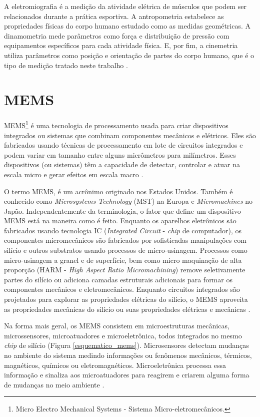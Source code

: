 A eletromiografia é a medição da atividade elétrica de músculos que podem ser relacionados durante a prática esportiva. A antropometria estabelece as propriedades físicas do corpo humano estudado como as medidas geométricas. A dinamometria mede parâmetros como força e distribuição de pressão com equipamentos específicos para cada atividade física. E, por fim, a cinemetria utiliza parâmetros como posição e orientação de partes do corpo humano, que é o tipo de medição tratado neste trabalho \cite{amadio2007}\cite{medeiros2013}.
	
	\section{MEMS}

		MEMS\footnote{Micro Electro Mechanical Systems - Sistema Micro-eletromecânicos.}  é uma tecnologia de processamento usada para criar dispositivos integrados ou sistemas que combinam componentes mecânicos e elétricos. Eles são fabricados usando técnicas de processamento em lote de circuitos integrados e podem variar em tamanho entre alguns micrômetros para milímetros. Esses dispositivos (ou sistemas) têm a capacidade de detectar, controlar e atuar na escala micro e gerar efeitos em escala macro \cite{prime2002}. 

		O termo MEMS, é um acrônimo originado nos Estados Unidos. Também é conhecido como \textit{Microsystems Technology} (MST) na Europa e \textit{Micromachines} no Japão. Independentemente da terminologia, o fator que define um dispositivo MEMS está na maneira como é feito. Enquanto os aparelhos eletrônicos são fabricados usando tecnologia IC (\textit{Integrated Circuit} - \textit{chip} de computador), os componentes micromecânicos são fabricados por sofisticadas manipulações com silício e outros substratos usando processos de micro-usinagem. Processos como micro-usinagem a granel e de superfície, bem como micro maquinação de alta proporção (HARM - \textit{High Aspect Ratio Micromachining}) remove seletivamente partes do silício ou adiciona camadas estruturais adicionais para formar os componentes mecânicos e eletromecânicos. Enquanto circuitos integrados são projetados para explorar as propriedades elétricas do silício, o MEMS aproveita as propriedades mecânicas do silício ou suas propriedades elétricas e mecânicas \cite{prime2002}.

		Na forma mais geral, os MEMS consistem em microestruturas mecânicas, microssensores, microatuadores e microeletrônica, todos integrados no mesmo \textit{chip} de silício (Figura \ref{esquematico_mems}). Microsensores detectam mudanças no ambiente do sistema medindo informações ou fenômenos mecânicos, térmicos, magnéticos, químicos ou eletromagnéticos. Microeletrônica processa essa informação e sinaliza aos microatuadores para reagirem e criarem alguma forma de mudanças no meio ambiente \cite{prime2002}.

